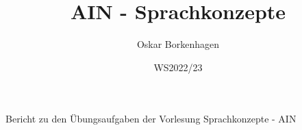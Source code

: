 \documentclass[11pt]{article}
\title{AIN - Sprachkonzepte}
\author{Oskar Borkenhagen}
\date{WS2022/23}
\begin{document}
    \maketitle
    Bericht zu den Übungsaufgaben der Vorlesung Sprachkonzepte - AIN
    \newpage

    

    
\end{document}
